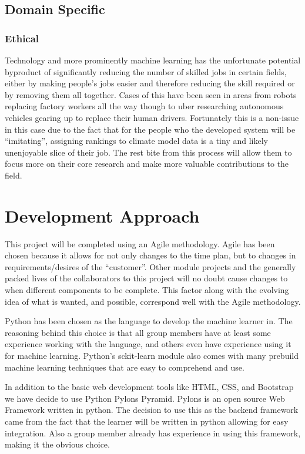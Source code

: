\documentclass[11pt]{article} %
\numberwithin{equation}{section}
\begin{document}
\subsection{Domain Specific}

\subsubsection{Ethical}

Technology and more prominently machine learning has the unfortunate
potential byproduct of significantly reducing the number of skilled
jobs in certain fields, either by making people's jobs easier and
therefore reducing the skill required or by removing them all together.
Cases of this have been seen in areas from robots replacing factory
workers all the way though to uber researching autonomous vehicles
gearing up to replace their human drivers. Fortunately this is a non-issue
in this case due to the fact that for the people who the developed
system will be ``imitating'', assigning rankings to climate model
data is a tiny and likely unenjoyable slice of their job. The rest bite
from this process will allow them to focus more on their core research
and make more valuable contributions to the field. 



\section{Development Approach}
\quad This project will be completed using an Agile methodology. Agile has been chosen because it allows for not only changes to the time plan, but to changes in requirements/desires of the “customer”. Other module projects and the generally packed lives of the collaborators to this project will no doubt cause changes to when different components to be complete. This factor along with the evolving idea of what is wanted, and possible, correspond well with the Agile methodology.\par

\quad Python has been chosen as the language to develop the machine learner in. The reasoning behind this choice is that all group members have at least some experience working with the language, and others even have experience using it for machine learning. Python’s sckit-learn module also comes with many prebuild machine learning techniques that are easy to comprehend and use.\par

\quad In addition to the basic web development tools like HTML, CSS, and Bootstrap we have decide to use Python Pylons Pyramid. Pylons is an open source Web Framework written in python. The decision to use this as the backend framework came from the fact that the learner will be written in python allowing for easy integration. Also a group member already has experience in using this framework, making it the obvious choice.\par
\end{document}
